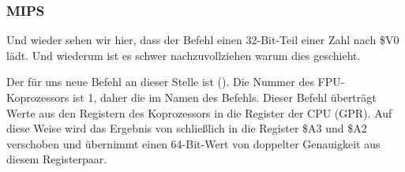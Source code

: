 \subsubsection{MIPS}


Und wieder sehen wir hier, dass der Befehl  einen 32-Bit-Teil einer
\Tdouble Zahl nach \$V0 lädt.
Und wiederum ist es schwer nachzuvollziehen warum dies geschieht.

Der für uns neue Befehl an dieser Stelle ist (). Die Nummer des FPU-Koprozessors ist 1, daher die  im Namen des
Befehls. 
Dieser Befehl überträgt Werte aus den Registern des Koprozessors in die Register
der CPU (\ac{GPR}).
Auf diese Weise wird das Ergebnis von  schließlich in die Register
\$A3 und \$A2 verschoben und \printf übernimmt einen 64-Bit-Wert von doppelter
Genauigkeit aus diesem Registerpaar.
